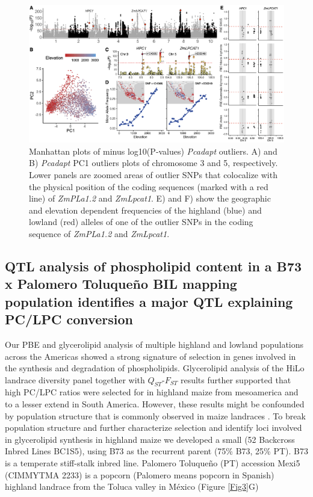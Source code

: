 \documentclass[9pt,twocolumn,twoside,lineno]{gsajnl}
\begin{document}
\begin{figure}[!ht]
\begin{center}
\includegraphics[width=0.4\paperwidth]{Figures/Fig_2.png}
\caption{Manhattan plots of minus log10(P‐values) \textit{Pcadapt} outliers. A) and B) \textit{Pcadapt} PC1 outliers plots of chromosome 3 and 5, respectively. 
Lower panels are zoomed areas of outlier SNPs that colocalize with the physical position of the coding sequences (marked with a red line) of \textit{ZmPLa1.2} and \textit{ZmLpcat1}. E) and F) show the geographic and elevation dependent frequencies of the highland (blue) and lowland (red) alleles of one of the outlier SNPs in the coding sequence of \textit{ZmPLa1.2} and \textit{ZmLpcat1}.}
\label{Fig2}
\end{center}
\end{figure} 

\subsection{QTL analysis of phospholipid content in a B73 x Palomero Toluqueño BIL mapping population identifies a major QTL explaining PC/LPC conversion} 

Our PBE and glycerolipid analysis of multiple highland and lowland populations across the Americas showed a strong signature of selection in genes involved in the synthesis and degradation of phospholipids. 
Glycerolipid analysis of the HiLo landrace diversity panel together with $Q_{ST}$-$F_{ST}$ results further supported that high PC/LPC ratios were selected for in highland maize from mesoamerica and to a lesser extend in South America.   
However, these results might be confounded by population structure that is commonly observed in maize landraces \cite{Romero_Navarro2017-cn}. 
To break population structure and further characterize selection and identify loci involved in glycerolipid synthesis in highland maize we developed a small (52 Backcross Inbred  Lines BC1S5), using B73 as the recurrent parent (75\% B73, 25\% PT). 
B73 is a temperate stiff-stalk inbred line. Palomero Toluqueño (PT) accession Mexi5 (CIMMYTMA 2233) is a popcorn (Palomero means popcorn in Spanish) highland landrace from the Toluca valley in México (Figure \ref{Fig3}G) 
\end{document}

